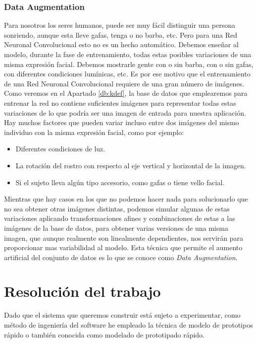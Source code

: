 \documentclass[a4paper,11pt]{book}
\begin{document}
\subsection{Data Augmentation}
Para nosotros los seres humanos, puede ser muy fácil distinguir una persona sonriendo, aunque esta lleve gafas, tenga o no barba, etc. Pero para una Red Neuronal Convolucional esto no es un hecho automático. Debemos enseñar al modelo, durante la fase de entrenamiento, todas estas posibles variaciones de una misma expresión facial. Debemos mostrarle gente con o sin barba, con o sin gafas, con diferentes condiciones lumínicas, etc. Es por ese motivo que el entrenamiento de una Red Neuronal Convolucional requiere de una gran número de imágenes. \\
Como veremos en el Apartado \ref{db:kdef}, la base de datos que emplearemos para entrenar la red no contiene suficientes imágenes para representar todas estas variaciones de lo que podría ser una imagen de entrada para nuestra aplicación. Hay muchos factores que pueden variar incluso entre dos imágenes del mismo individuo con la misma expresión facial, como por ejemplo:
\begin{itemize}
	\item Diferentes condiciones de luz.
	\item La rotación del rostro con respecto al eje vertical y horizontal de la imagen.
	\item Si el sujeto lleva algún tipo accesorio, como gafas o tiene vello facial.
\end{itemize}
Mientras que hay casos en los que no podemos hacer nada para solucionarlo que no sea obtener otras imágenes distintas, podemos simular algunas de estas variaciones aplicando transformaciones afines y combinaciones de estas a las imágenes de la base de datos, para obtener varias versiones de una misma imagen, que aunque realmente son linealmente dependientes, nos servirán para proporcionar mas variabilidad al modelo. Esta técnica que permite el aumento artificial del conjunto de datos es lo que se conoce como \textit{Data Augmentation}.


\chapter{Resolución del trabajo}
Dado que el sistema que queremos construir está sujeto a experimentar, como método de ingeniería del software he empleado la técnica de modelo de prototipos rápido o también conocida como modelado de prototipado rápido\cite{ecured_a}.
\end{document}
